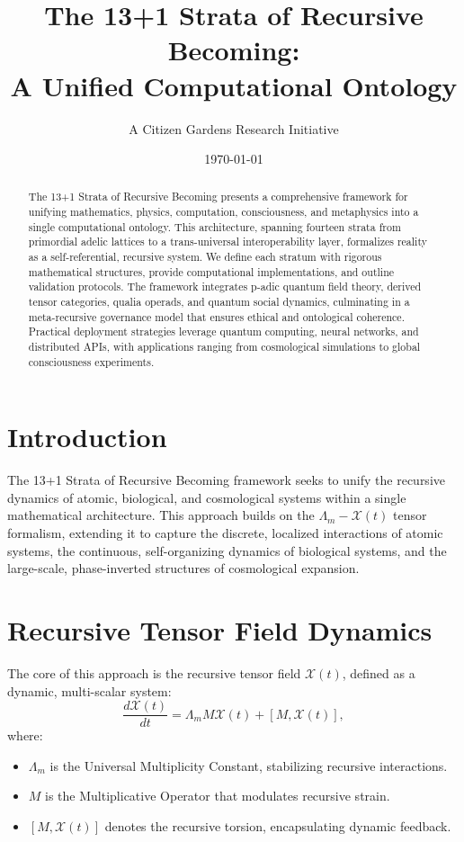 \documentclass[11pt]{article}
\title{The 13+1 Strata of Recursive Becoming: \\
\Large A Unified Computational Ontology
}
\author{A Citizen Gardens Research Initiative}
\date{\today}
\newcommand{\Xi}{\mathcal{X}}
\begin{document}
\maketitle

\begin{abstract}
The 13+1 Strata of Recursive Becoming presents a comprehensive framework for unifying mathematics, physics, computation, consciousness, and metaphysics into a single computational ontology. This architecture, spanning fourteen strata from primordial adelic lattices to a trans-universal interoperability layer, formalizes reality as a self-referential, recursive system. We define each stratum with rigorous mathematical structures, provide computational implementations, and outline validation protocols. The framework integrates p-adic quantum field theory, derived tensor categories, qualia operads, and quantum social dynamics, culminating in a meta-recursive governance model that ensures ethical and ontological coherence. Practical deployment strategies leverage quantum computing, neural networks, and distributed APIs, with applications ranging from cosmological simulations to global consciousness experiments.
\end{abstract}

\section{Introduction}
The 13+1 Strata of Recursive Becoming framework seeks to unify the recursive dynamics of atomic, biological, and cosmological systems within a single mathematical architecture. This approach builds on the $\Lambda_m-\Xi(t)$ tensor formalism, extending it to capture the discrete, localized interactions of atomic systems, the continuous, self-organizing dynamics of biological systems, and the large-scale, phase-inverted structures of cosmological expansion.

\section{Recursive Tensor Field Dynamics}
The core of this approach is the recursive tensor field $\Xi(t)$, defined as a dynamic, multi-scalar system:
\begin{equation}
\frac{d\Xi(t)}{dt} = \Lambda_m M \Xi(t) + [M, \Xi(t)],
\end{equation}
where:
\begin{itemize}
    \item $\Lambda_m$ is the Universal Multiplicity Constant, stabilizing recursive interactions.
    \item $M$ is the Multiplicative Operator that modulates recursive strain.
    \item $[M, \Xi(t)]$ denotes the recursive torsion, encapsulating dynamic feedback.
\end{itemize}
\end{document}
